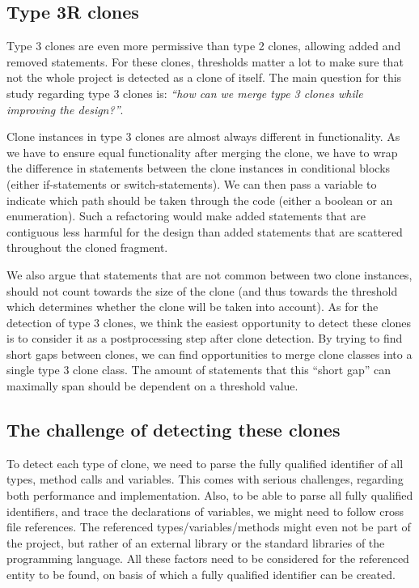 \documentclass[a4paper]{article}
\begin{document}
\subsection{Type 3R clones}
Type 3 clones are even more permissive than type 2 clones, allowing added and removed statements. For these clones, thresholds matter a lot to make sure that not the whole project is detected as a clone of itself. The main question for this study regarding type 3 clones is: \textit{``how can we merge type 3 clones while improving the design?''}.

Clone instances in type 3 clones are almost always different in functionality. As we have to ensure equal functionality after merging the clone, we have to wrap the difference in statements between the clone instances in conditional blocks (either if-statements or switch-statements). We can then pass a variable to indicate which path should be taken through the code (either a boolean or an enumeration). Such a refactoring would make added statements that are contiguous less harmful for the design than added statements that are scattered throughout the cloned fragment.

We also argue that statements that are not common between two clone instances, should not count towards the size of the clone (and thus towards the threshold which determines whether the clone will be taken into account). As for the detection of type 3 clones, we think the easiest opportunity to detect these clones is to consider it as a postprocessing step after clone detection. By trying to find short gaps between clones, we can find opportunities to merge clone classes into a single type 3 clone class. The amount of statements that this ``short gap'' can maximally span should be dependent on a threshold value.

\subsection{The challenge of detecting these clones}\label{chap:challenge}
To detect each type of clone, we need to parse the fully qualified identifier of all types, method calls and variables. This comes with serious challenges, regarding both performance and implementation. Also, to be able to parse all fully qualified identifiers, and trace the declarations of variables, we might need to follow cross file references. The referenced types/variables/methods might even not be part of the project, but rather of an external library or the standard libraries of the programming language. All these factors need to be considered for the referenced entity to be found, on basis of which a fully qualified identifier can be created.
\end{document}
